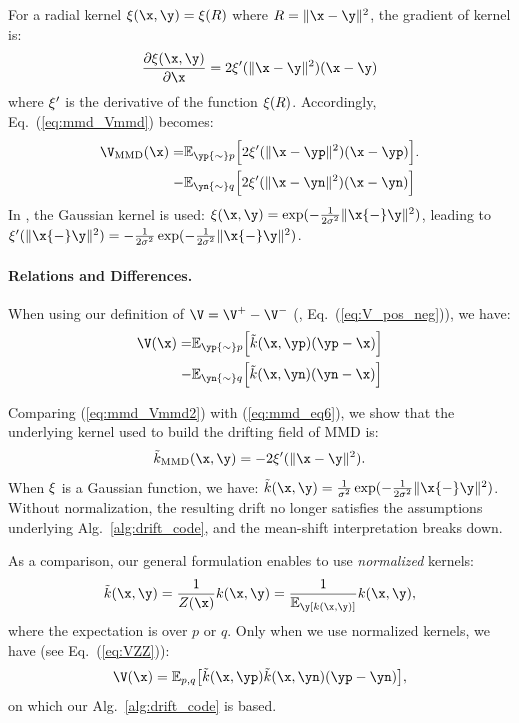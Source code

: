 For a radial kernel $\kk(\x, \y)=\kk(R)$ where  $R=\|\x - \y\|^2$, the gradient of kernel is:
\begin{equation}
\frac{\partial\kk(\x, \y)}{\partial\x} = 
2\kk'(\|\x - \y\|^2)(\x - \y)
\end{equation}
where $\xi'$ is the derivative of the function $\xi(R)$.
Accordingly, Eq.~(\ref{eq:mmd_Vmmd}) becomes:
\begin{equation}
\begin{aligned}
\label{eq:mmd_Vmmd2}
\V_\text{MMD}(\x)
= &
\mathbb{E}_{\yp{\sim}p} \Big[
2\kk'(\|\x - \yp\|^2)(\x - \yp)
\Big].
\\ - &
\mathbb{E}_{\yn{\sim}q} \Big[
2\kk'(\|\x - \yn\|^2)(\x - \yn)
\Big]
\end{aligned}
\end{equation}
In \cite{li2015generative}, the Gaussian kernel is used: $\kk(\x, \y) = \exp (-\frac{1}{2\sigma^2} \|\x{-}\y\|^2)$, leading to $\kk'(\|\x{-}\y\|^2)=-\frac{1}{2\sigma^2}\exp (-\frac{1}{2\sigma^2} \|\x{-}\y\|^2)$.

\paragraph{Relations and Differences.}
When using our definition of $\V = \V^{+} - \V^{-}$ (\ie, Eq.~(\ref{eq:V_pos_neg})), we have:
\begin{equation}
\begin{aligned}
\label{eq:mmd_eq6}
\V(\x)
= & 
\mathbb{E}_{\yp{\sim}p} \Big[
\tilde{k}(\x, \yp)(\yp - \x)
\Big] \\
- &
\mathbb{E}_{\yn{\sim}q} \Big[
\tilde{k}(\x, \yn)(\yn - \x)
\Big]
\end{aligned}
\end{equation}

Comparing (\ref{eq:mmd_Vmmd2}) with (\ref{eq:mmd_eq6}), we show that the underlying kernel used to build the drifting field of MMD is:
\begin{equation}
\label{eq:mmd_eq7}
\tilde{k}_\text{MMD}(\x, \y)=-2\kk'(\|\x - \y\|^2).
\end{equation}
When $\xi$ is a Gaussian function, we have: $\tilde{k}(\x, \y)=\frac{1}{\sigma^2}\exp (-\frac{1}{2\sigma^2} \|\x{-}\y\|^2)$.
Without normalization, the resulting drift no longer satisfies the assumptions underlying Alg.~\ref{alg:drift_code}, and the mean-shift interpretation breaks down.

As a comparison, our general formulation enables to use \textit{normalized} kernels:
\begin{equation}
\tilde{k}(\x, \y)=\frac{1}{Z(\x)}k(\x, \y)=\frac{1}{\mathbb{E}_\y[k(\x, \y)]}k(\x, \y),
\end{equation}
where the expectation is over $p$ or $q$.
Only when we use normalized kernels, we have (see Eq.~(\ref{eq:VZZ})):
\begin{equation}
\V(\x)
= {\mathbb{E}_{p,q}\!\left[\tilde{k}(\x,\yp)\tilde{k}(\x,\yn)(\yp - \yn)\right]},
\end{equation}
on which our Alg.~\ref{alg:drift_code} is based.

